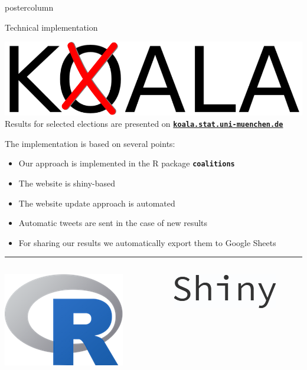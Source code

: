 \documentclass[final,hyperref={pdfpagelabels=false}]{beamer}
\newcommand{\bfBlue}[1]{\textcolor{koaladarkestblue}{\textbf{#1}}}
\newcommand*\circled[1]{\tikz[baseline=(char.base)]{
\node[shape=circle,draw,inner sep=2pt] (char) {#1};}}
\begin{document}
\begin{frame}
\begin{columns}
\begin{column}{1\textwidth}
\begin{columns}[T]
\begin{column}{.484\textwidth}
\begin{beamercolorbox}[center,wd=\textwidth]{postercolumn}
\begin{minipage}[T]{.95\textwidth}
\begin{block}{\footnotesize \circled{3} Technical implementation}
\begin{center}
\includegraphics[height=5ex]{figures/Koala_Logo_ohneSchrift}
\\[2ex]
Results for selected elections are presented on
\bfBlue{\texttt{\href{http://koala.stat.uni-muenchen.de}{koala.stat.uni-muenchen.de}}}
\end{center}
\vspace{2ex}
The implementation is based on several points:
\begin{itemize}
  \item Our approach is implemented in the R package \bfBlue{\texttt{coalitions}} 
  \item The website is shiny-based
  \item The website update approach is automated
  \item Automatic tweets are sent in the case of new results
  \item For sharing our results we automatically export them to Google Sheets
\end{itemize}

\vspace{1ex}
\textcolor{LMUlightgray}{\hrule{}}
\vspace{1ex}
\begin{columns}[t]
  \begin{column}{.15\textwidth}
  \begin{center}
  \includegraphics[height=5ex]{figures/implementation_r}
  \end{center}
  \end{column}

  \hspace{-1.5ex}
  \textcolor{LMUlightgray}{\vrule{}}
  \hspace{1.5ex}

  \begin{column}{.15\textwidth}
  \begin{center}
  \vspace{1ex}
  \includegraphics[height=3ex]{figures/implementation_shiny}
  \end{center}
  \end{column}


\end{columns}
\end{block}
\end{minipage}
\end{beamercolorbox}
\end{column}
\end{columns}
\end{column}
\end{columns}
\end{frame}
\end{document}

